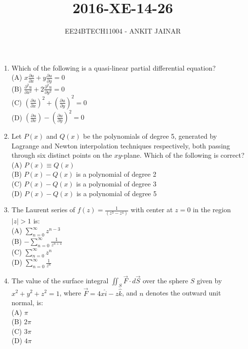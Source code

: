 \documentclass[journal,12pt,onecolumn]{IEEEtran}
\theoremstyle{remark}
\begin{document}

\vspace{3cm}

\title{2016-XE-14-26}
\author{EE24BTECH11004 - ANKIT JAINAR}
\maketitle
\bigskip

\renewcommand{\thefigure}{\theenumi}
\renewcommand{\thetable}{\theenumi}
\setlength{\columnsep}{2.5em}


\begin{enumerate}
    \item Which of the following is a quasi-linear partial differential equation? \\
    (A) $x \frac{\partial u}{\partial x} + y \frac{\partial u}{\partial y} = 0$ \\
    (B) $\frac{\partial^2 u}{\partial x^2} + 2 \frac{\partial^2 u}{\partial y^2} = 0$ \\
    (C) $\left( \frac{\partial u}{\partial x} \right)^2 + \left( \frac{\partial u}{\partial y} \right)^2 = 0$ \\
    (D) $\left( \frac{\partial u}{\partial x} \right) - \left( \frac{\partial u}{\partial y} \right)^2 = 0$

    \item Let $P(x)$ and $Q(x)$ be the polynomials of degree 5, generated by Lagrange and Newton interpolation techniques respectively, both passing through six distinct points on the $xy$-plane. Which of the following is correct? \\
    (A) $P(x) \equiv Q(x)$ \\
    (B) $P(x) - Q(x)$ is a polynomial of degree 2 \\
    (C) $P(x) - Q(x)$ is a polynomial of degree 3 \\
    (D) $P(x) - Q(x)$ is a polynomial of degree 5

    \item The Laurent series of $f(z) = \frac{1}{(z^3 - z^4)}$ with center at $z = 0$ in the region $|z| > 1$ is: \\
    (A) $\sum_{n=0}^{\infty} z^{n-3}$ \\
    (B) $-\sum_{n=0}^{\infty} \frac{1}{z^{n+4}}$ \\
    (C) $\sum_{n=0}^{\infty} z^n$ \\
    (D) $\sum_{n=0}^{\infty} \frac{1}{z^n}$

    \item The value of the surface integral $\iint_S \vec{F} \cdot d\vec{S}$ over the sphere $S$ given by $x^2 + y^2 + z^2 = 1$, where $\vec{F} = 4x \hat{i} - z \hat{k}$, and $n$ denotes the outward unit normal, is: \\
    (A) $\pi$ \\
    (B) $2\pi$ \\
    (C) $3\pi$ \\
    (D) $4\pi$


\end{enumerate}
\end{document}
